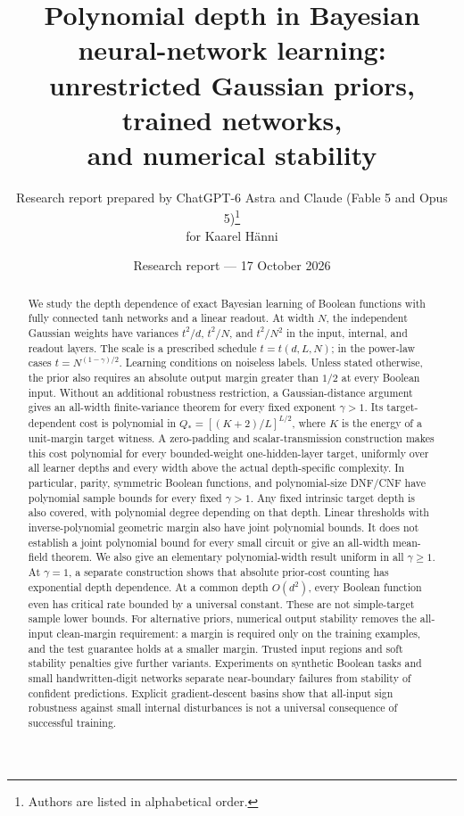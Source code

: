 \documentclass[11pt]{article}
\title{Polynomial depth in Bayesian neural-network learning:\\unrestricted Gaussian priors, trained networks,\\and numerical stability}
\author{Research report prepared by ChatGPT-6 Astra and Claude (Fable 5 and Opus 5)\thanks{Authors are listed in alphabetical order.}\\for Kaarel H\"anni}
\date{Research report --- 17 October 2026}
\begin{document}
\maketitle
\begin{abstract}
We study the depth dependence of exact Bayesian learning of Boolean
functions with fully connected tanh networks and a linear readout.
At width $N$, the independent Gaussian weights have variances
$t^2/d$, $t^2/N$, and $t^2/N^2$ in the input, internal, and readout layers.
The scale is a prescribed schedule $t=t(d,L,N)$; in the power-law cases
$t=N^{(1-\gamma)/2}$. Learning conditions on noiseless labels.
Unless stated otherwise, the prior also requires an absolute output
margin greater than $1/2$ at every Boolean input. Without an additional robustness restriction,
a Gaussian-distance argument gives an all-width finite-variance theorem for
every fixed exponent $\gamma>1$. Its target-dependent cost is polynomial in
$Q_*=[(K+2)/L]^{L/2}$, where $K$ is the energy of a unit-margin target
witness. A zero-padding and scalar-transmission construction makes this cost
polynomial for every bounded-weight one-hidden-layer target, uniformly
over all learner depths and every width above the actual depth-specific
complexity. In particular, parity, symmetric Boolean functions, and
polynomial-size DNF/CNF have polynomial sample bounds for every fixed
$\gamma>1$. Any fixed intrinsic target depth is also covered, with
polynomial degree depending on that depth.
Linear thresholds with inverse-polynomial geometric margin
also have joint polynomial bounds. It does not establish a joint polynomial
bound for every small circuit or give an all-width mean-field theorem.
We also give an elementary polynomial-width result uniform in all
$\gamma\ge1$. At $\gamma=1$, a separate construction shows that absolute
prior-cost counting has exponential depth dependence. At a common depth
$O(d^2)$, every Boolean function even has critical rate bounded by a
universal constant. These are not simple-target sample lower bounds.
For alternative priors, numerical output stability removes
the all-input clean-margin requirement: a margin is required only on the
training examples, and the test guarantee holds at a smaller margin.
Trusted input regions and soft stability penalties give further variants.
Experiments on synthetic Boolean tasks and small handwritten-digit networks
separate near-boundary failures from stability of confident predictions.
Explicit gradient-descent basins show that all-input sign robustness against small internal disturbances
is not a universal consequence of successful training.
\end{abstract}
\end{document}
